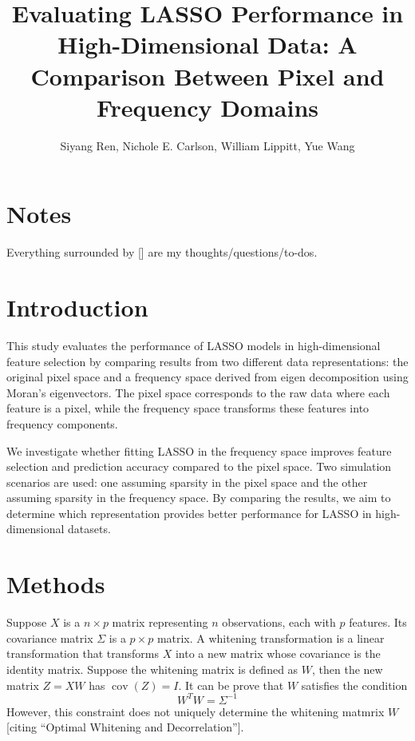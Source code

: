 \documentclass[12pt]{article}
\begin{document}
\title{Evaluating LASSO Performance in High-Dimensional Data: A Comparison Between Pixel and Frequency Domains}
\author{Siyang Ren, Nichole E. Carlson, William Lippitt, Yue Wang}
\date{}
\maketitle


\section*{Notes}

Everything surrounded by [] are my thoughts/questions/to-dos.


\section*{Introduction}

This study evaluates the performance of LASSO models in high-dimensional feature selection by comparing results from two different data representations: the original pixel space and a frequency space derived from eigen decomposition using Moran’s eigenvectors. The pixel space corresponds to the raw data where each feature is a pixel, while the frequency space transforms these features into frequency components.

We investigate whether fitting LASSO in the frequency space improves feature selection and prediction accuracy compared to the pixel space. Two simulation scenarios are used: one assuming sparsity in the pixel space and the other assuming sparsity in the frequency space. By comparing the results, we aim to determine which representation provides better performance for LASSO in high-dimensional datasets.


\section*{Methods}

Suppose \( X \) is a \( n \times p \) matrix representing \( n \) observations, each with \( p \) features. Its covariance matrix \( \Sigma \) is a \( p \times p \) matrix. A whitening transformation is a linear transformation that transforms \( X \) into a new matrix whose covariance is the identity matrix. Suppose the whitening matrix is defined as \( W \), then the new matrix \( Z = X W \) has \( \operatorname*{cov} (Z) = I \). It can be prove that \( W \) satisfies the condition
\[
  W^T W = \Sigma^{-1}
\]
However, this constraint does not uniquely determine the whitening matmrix \( W \) [citing ``Optimal Whitening and Decorrelation''].
\end{document}
